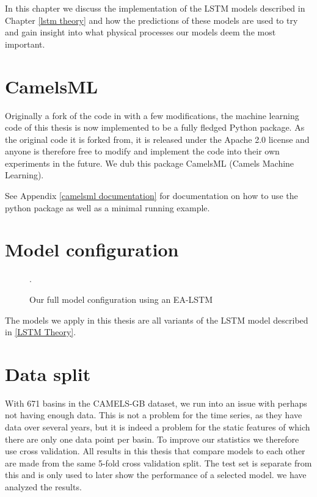 In this chapter we discuss the implementation of the LSTM models described in Chapter 
\ref{lstm theory} and how the predictions of these models are used to try and gain 
insight into what physical processes our models deem the most important.
\section{CamelsML}
Originally a fork of the code in \cite{lstm_second_paper} with a few modifications, 
the machine learning code of this thesis is now implemented to be a fully fledged 
Python package. As the original code it is forked from, it is released under the 
Apache 2.0 license and anyone is therefore free to modify and implement the code 
into their own experiments in the future.
We dub this package CamelsML (Camels Machine Learning).


See Appendix \ref{camelsml documentation} for documentation on how to use the python 
package as well as a minimal running example.

\section{Model configuration}
\begin{figure}
\caption{Our full model configuration using an EA-LSTM \cite{lstm_second_paper}}.
\end{figure}
The models we apply in this thesis are all variants of the LSTM model described 
in \ref{LSTM Theory}.
\section{Data split}
With 671 basins in the CAMELS-GB dataset, we run into an issue with perhaps not 
having enough data. This is not a problem for the time series, as they have data 
over several years, but it is indeed a problem for the static features of which there 
are only one data point per basin. To improve our statistics we therefore use 
cross validation. All results in this thesis that compare models to each other 
are made from the same 5-fold cross validation split. The test set is separate 
from this and is only used to later show the performance of a selected model.
we have analyzed the results.

